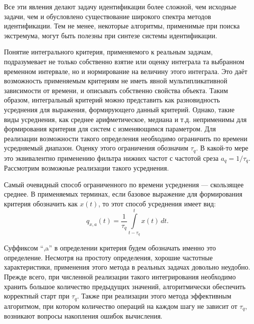 
Все эти явления делают задачу идентификации более сложной, чем
исходные задачи, чем и обусловлено
существование широкого спектра методов идентификации. Тем не менее,
некоторые алгоритмы, применимые при поиска экстремума, могут быть
полезны при синтезе системы идентификации.


Понятие интегрального критерия, применяемого к реальным
задачам, подразумевает не только собственно взятие или оценку интеграла
та выбранном временном интервале, но и нормирование на величину этого интеграла.
Это даёт возможность применяемым критериям не иметь явной мультипликативной
зависимости от времени, и описывать собственно свойства объекта.
Таким образом, интегральный критерий можно представить как
разновидность усреднения для выражения, формирующего данный критерий.
Однако, такие виды усреднения, как среднее арифметическое, медиана и т.д.
неприменимы для формирования критерия для систем с изменяющимся параметром.
Для реализации возможности такого определения необходимо ограничить
по времени усредняемый диапазон.
Оценку этого ограничения обозначим
\label{atu:d:tau_q}$\tau_q$.
В какой-то мере это эквивалентно
применению фильтра нижних частот с частотой среза
\label{atu:d:a_q}$a_q = 1 / \tau_q$.
Рассмотрим возможные реализации такого усреднения.

Самый очевидный способ ограниченного по времени усреднения ---
скользящее среднее. %
В применяемых терминах, если базовое выражение для формирования критерия
обозначить как $x(t)$, то этот способ усреднения имеет вид:
%
\begin{equation}
  q_{x,a}(t) =
  \frac{1}{\tau_q}
  \int\limits_{t-\tau_q}^{t} x(t) \, dt.
  \label{atu:eq:moving_avarage}
\end{equation}

Суффиксом ``,a'' в определении критерия будем обозначать
именно это определение.
Несмотря на простоту определения, хорошие частотные характеристики,
применения этого метода в реальных задачах довольно неудобно.
Прежде всего, при численной реализации такого интегрирования
необходимо хранить большое количество предыдущих значений,
алгоритмически обеспечить корректный старт при $\tau_q$.
Также при реализации этого метода эффективным алгоритмом,
при котором количество операций на каждом шагу не зависит от $\tau_q$,
возникают вопросы накопления ошибок вычисления.

